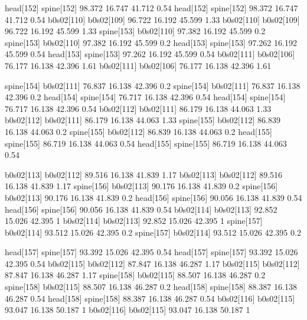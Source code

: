 head[152]    spine[152]    98.372    16.747    41.712    0.54
head[152]    spine[152]    98.372    16.747    41.712    0.54
b0s02[110]    b0s02[109]    96.722    16.192    45.599    1.33
b0s02[110]    b0s02[109]    96.722    16.192    45.599    1.33
spine[153]    b0s02[110]    97.382    16.192    45.599    0.2
spine[153]    b0s02[110]    97.382    16.192    45.599    0.2
head[153]    spine[153]    97.262    16.192    45.599    0.54
head[153]    spine[153]    97.262    16.192    45.599    0.54
b0s02[111]    b0s02[106]    76.177    16.138    42.396    1.61
b0s02[111]    b0s02[106]    76.177    16.138    42.396    1.61


spine[154]    b0s02[111]    76.837    16.138    42.396    0.2
spine[154]    b0s02[111]    76.837    16.138    42.396    0.2
head[154]    spine[154]    76.717    16.138    42.396    0.54
head[154]    spine[154]    76.717    16.138    42.396    0.54
b0s02[112]    b0s02[111]    86.179    16.138    44.063    1.33
b0s02[112]    b0s02[111]    86.179    16.138    44.063    1.33
spine[155]    b0s02[112]    86.839    16.138    44.063    0.2
spine[155]    b0s02[112]    86.839    16.138    44.063    0.2
head[155]    spine[155]    86.719    16.138    44.063    0.54
head[155]    spine[155]    86.719    16.138    44.063    0.54


b0s02[113]    b0s02[112]    89.516    16.138    41.839    1.17
b0s02[113]    b0s02[112]    89.516    16.138    41.839    1.17
spine[156]    b0s02[113]    90.176    16.138    41.839    0.2
spine[156]    b0s02[113]    90.176    16.138    41.839    0.2
head[156]    spine[156]    90.056    16.138    41.839    0.54
head[156]    spine[156]    90.056    16.138    41.839    0.54
b0s02[114]    b0s02[113]    92.852    15.026    42.395    1
b0s02[114]    b0s02[113]    92.852    15.026    42.395    1
spine[157]    b0s02[114]    93.512    15.026    42.395    0.2
spine[157]    b0s02[114]    93.512    15.026    42.395    0.2


head[157]    spine[157]    93.392    15.026    42.395    0.54
head[157]    spine[157]    93.392    15.026    42.395    0.54
b0s02[115]    b0s02[112]    87.847    16.138    46.287    1.17
b0s02[115]    b0s02[112]    87.847    16.138    46.287    1.17
spine[158]    b0s02[115]    88.507    16.138    46.287    0.2
spine[158]    b0s02[115]    88.507    16.138    46.287    0.2
head[158]    spine[158]    88.387    16.138    46.287    0.54
head[158]    spine[158]    88.387    16.138    46.287    0.54
b0s02[116]    b0s02[115]    93.047    16.138    50.187    1
b0s02[116]    b0s02[115]    93.047    16.138    50.187    1



